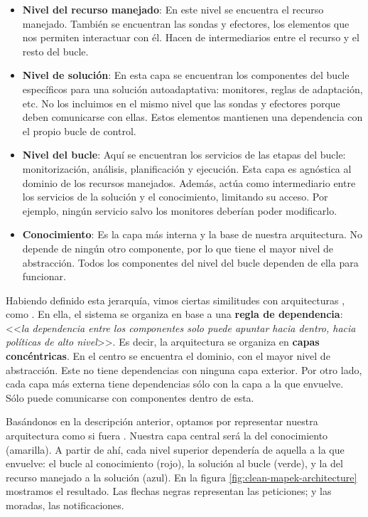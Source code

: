 \begin{itemize}
  \item \textbf{Nivel del recurso manejado}: En este nivel se encuentra el recurso manejado. También se encuentran las sondas y efectores, los elementos que nos permiten interactuar con él. Hacen de intermediarios entre el recurso y el resto del bucle.

  \item \textbf{Nivel de solución}: En esta capa se encuentran los componentes del bucle específicos para una solución autoadaptativa: monitores, reglas de adaptación, etc. No los incluimos en el mismo nivel que las sondas y efectores porque deben comunicarse con ellas. Estos elementos mantienen una dependencia con el propio bucle de control.

  \item \textbf{Nivel del bucle}: Aquí se encuentran los servicios de las etapas del bucle: monitorización, análisis, planificación y ejecución. Esta capa es agnóstica al dominio de los recursos manejados. Además, actúa como intermediario entre los servicios de la solución y el conocimiento, limitando su acceso. Por ejemplo, ningún servicio salvo los monitores deberían poder modificarlo.

  \item \textbf{Conocimiento}: Es la capa más interna y la base de nuestra arquitectura. No depende de ningún otro componente, por lo que tiene el mayor nivel de abstracción. Todos los componentes del nivel del bucle dependen de ella para funcionar.

\end{itemize}

Habiendo definido esta jerarquía, vimos ciertas similitudes con arquitecturas , como . \cite{martinChapter22Clean2018a} En ella, el sistema se organiza en base a una \textbf{regla de dependencia}: <<\emph{la dependencia entre los componentes solo puede apuntar hacia dentro, hacia políticas de alto nivel}>>. Es decir, la arquitectura se organiza en \textbf{capas concéntricas}. En el centro se encuentra el dominio, con el mayor nivel de abstracción. Este no tiene dependencias con ninguna capa exterior. Por otro lado, cada capa más externa tiene dependencias sólo con la capa a la que envuelve. Sólo puede comunicarse con componentes dentro de esta.

Basándonos en la descripción anterior, optamos por representar nuestra arquitectura como si fuera  \cite{taylorSoftwareArchitectureFoundations2009}. Nuestra capa central será la del conocimiento (amarilla). A partir de ahí, cada nivel superior dependería de aquella a la que envuelve: el bucle al conocimiento (rojo), la solución al bucle (verde), y la del recurso manejado a la solución (azul). En la figura \ref{fig:clean-mapek-architecture} mostramos el resultado. Las flechas negras representan las peticiones; y las moradas, las notificaciones.

